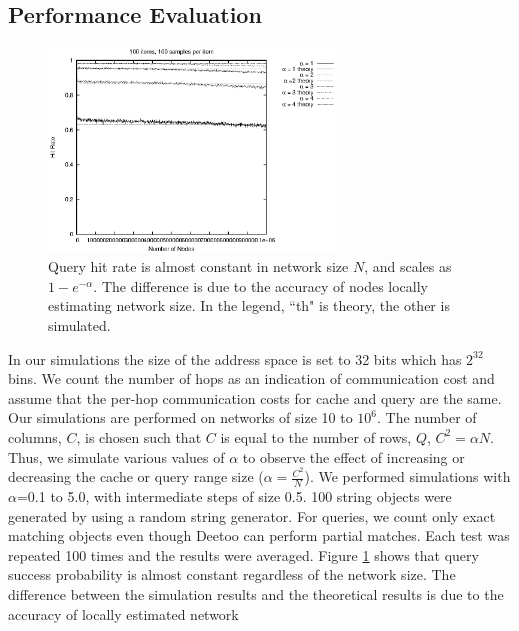 \documentclass[conference]{IEEEtran}
\begin{document}
\subsection{Performance Evaluation} 
\begin{figure}
\centering
\includegraphics[width=3in]{th_hitrate1}
\caption{Query hit rate is almost constant in network size $N$, and scales
as $1-e^{-\alpha}$. The difference is due to the accuracy of nodes locally 
estimating network size. In the legend, ``th" is theory, the other is simulated.} \label{fig:hitrate}
\end{figure}
In our simulations the size of the address space is set to 32 bits which has $2^{32}$
bins. 
We count the number of hops as an indication of communication cost and assume that the 
per-hop communication costs for cache and query are the same. 
Our simulations are performed on networks of size 10 to $10^{6}$.
The number of columns, $C$, is chosen such that $C$ is equal to the number of rows, $Q$, 
$C^2 = \alpha N$. Thus, we simulate various values of $\alpha$ to observe the effect of
increasing or decreasing the cache or query range size ($\alpha=\frac{C^2}{N}$). 
We performed simulations with $\alpha$=0.1 to 5.0, with intermediate steps of size 0.5.
100 string objects were generated by using a random string generator.
For queries, we count only exact matching objects even though Deetoo can perform partial matches.
Each test was repeated 100 times and the results were averaged. 
Figure \ref{fig:hitrate} shows that query success probability is almost constant 
regardless of the network size. The difference between the simulation results and 
the theoretical results is due to the accuracy of locally estimated network
\end{document}
